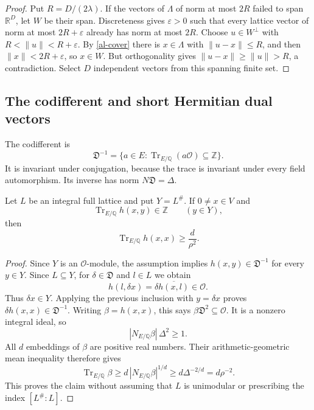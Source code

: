 \begin{proof}
Put $R=D/(2\lambda)$. If the vectors of $\Lambda$ of norm at
most $2R$ failed to span $\mathbb R^D$, let $W$ be their span.
Discreteness gives $\varepsilon>0$ such that every lattice vector
of norm at most $2R+\varepsilon$ already has norm at most $2R$.
Choose $u\in W^\perp$ with $R<\|u\|<R+\varepsilon$.
By \eqref{al-cover} there is $x\in\Lambda$ with
$\|u-x\|\leq R$, and then $\|x\|<2R+\varepsilon$, so
$x\in W$. But orthogonality gives
$\|u-x\|\geq\|u\|>R$, a contradiction.
Select $D$ independent vectors from this spanning finite set.
\end{proof}

\subsection{The codifferent and short Hermitian dual vectors}

The codifferent is
\[
 \mathfrak D^{-1}
  =\{a\in E:\operatorname{Tr}_{E/\mathbb Q}(a\mathcal O)
                                                    \subseteq\mathbb Z\}.
\]
It is invariant under conjugation, because the trace is invariant
under every field automorphism. Its inverse has norm
$N\mathfrak D=\Delta$.

\begin{lemma}\label{al-trace-dual}
Let $L$ be an integral full lattice and put $Y=L^\#$.
If $0\ne x\in V$ and
\[
       \operatorname{Tr}_{E/\mathbb Q}h(x,y)\in\mathbb Z
                                      \qquad(y\in Y),
\]
then
\begin{equation}\label{al-trace-lower}
             \operatorname{Tr}_{E/\mathbb Q}h(x,x)
                                      \geq\frac d{\rho^2}.
\end{equation}
\end{lemma}
\begin{proof}
Since $Y$ is an $\mathcal O$-module, the assumption implies
$h(x,y)\in\mathfrak D^{-1}$ for every $y\in Y$.
Since $L\subseteq Y$, for $\delta\in\mathfrak D$ and $l\in L$
we obtain
\[
 h(l,\delta x)=\delta\overline{h(x,l)}\in\mathcal O.
\]
Thus $\delta x\in Y$. Applying the previous inclusion with
$y=\delta x$ proves $\delta h(x,x)\in\mathfrak D^{-1}$.
Writing $\beta=h(x,x)$, this says
$\beta\mathfrak D^2\subseteq\mathcal O$.
It is a nonzero integral ideal, so
\[
       |N_{E/\mathbb Q}\beta|\,\Delta^2\geq1.
\]
All $d$ embeddings of $\beta$ are positive real numbers.
Their arithmetic-geometric mean inequality therefore gives
\[
 \operatorname{Tr}_{E/\mathbb Q}\beta
       \geq d\,|N_{E/\mathbb Q}\beta|^{1/d}
       \geq d\Delta^{-2/d}=d\rho^{-2}.
\]
This proves the claim without assuming that $L$ is unimodular
or prescribing the index $[L^\#:L]$.
\end{proof}

